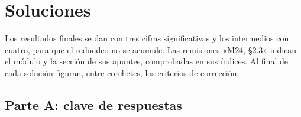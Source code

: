 \chapter{Soluciones}
\label{ap:soluciones}

Los resultados finales se dan con tres cifras significativas y los intermedios con cuatro, para que el redondeo no se acumule. Las remisiones «M24, §2.3» indican el módulo y la sección de sus apuntes, comprobadas en sus índices. Al final de cada solución figuran, entre corchetes, los criterios de corrección.

\section{Parte A: clave de respuestas}

